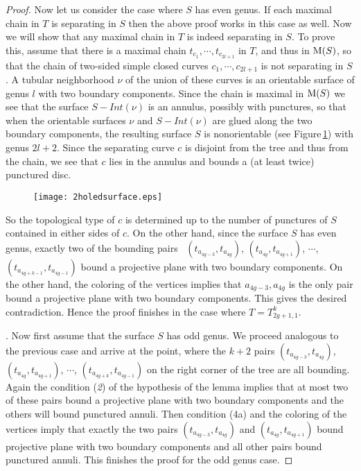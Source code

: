 \documentclass[11 pt]{amsart}
\theoremstyle{definition}
\begin{document}
\begin{proof}
Now let us consider the case where $S$ has even genus. If each
maximal chain in $T$ is separating in $S$ then the above proof works
in this case as well. Now we will show that any maximal chain in $T$
is indeed separating in $S$. To prove this, assume that there is a
maximal chain $t_{c_1},\cdots,t_{c_{2l+1}}$ in $T$, and thus in
${\rm M}(S)$, so that the chain of two-sided simple closed curves
$c_1,\cdots,c_{2l+1}$ is not separating in $S$. A tubular
neighborhood $\nu$ of the union of these curves is an orientable
surface of genus $l$ with two boundary components. Since the chain
is maximal in ${\rm M}(S)$ we see that the surface $S-Int(\nu)$ is
an annulus, possibly with punctures, so that when the orientable
surfaces $\nu$ and $S-Int(\nu)$ are glued along the two boundary
components, the resulting surface $S$ is nonorientable (see
Figure\,\ref{2holedsurface}) with genus $2l+2$. Since the separating
curve $c$ is disjoint from the tree and thus from the chain, we see
that $c$ lies in the annulus and bounds a (at least twice) punctured
disc.

\begin{figure}[hbt]
 \begin{center}
 \texttt{[image: 2holedsurface.eps]}
\caption {} \label{2holedsurface}
\end{center}
\end{figure}

So the topological type of $c$ is determined up to the number of
punctures of $S$ contained in either sides of $c$. On the other
hand, since the surface $S$ has even genus, exactly two of the
bounding pairs  \ $(t_{a_{4g-3}},t_{a_{4g}})$,
$(t_{a_{4g}},t_{a_{4g+1}})$, $\cdots$,
$(t_{a_{4g+k-1}},t_{a_{4g-1}})$ bound a projective plane with two
boundary components. On the other hand, the coloring of the vertices
implies that $a_{4g-3},a_{4g}$ is the only pair bound a projective
plane with two boundary components. This gives the desired
contradiction. Hence the proof finishes in the case where
$T=T_{2g+1,1}^k$.
\bigskip

. Now first assume that the
surface $S$ has odd genus. We proceed analogous to the previous case
and arrive at the point, where the $k+2$ pairs
$(t_{a_{4g-3}},t_{a_{4g}})$, $(t_{a_{4g}},t_{a_{4g+1}})$, $\cdots$,
$(t_{a_{4g+k}},t_{a_{4g-1}})$ on the right corner of the tree are
all bounding. Again the condition ({\it 2}) of the hypothesis of the
lemma implies that at most two of these pairs bound a projective
plane with two boundary components and the others will bound
punctured annuli. Then condition (4a) and the coloring of the
vertices imply that exactly the two pairs
$(t_{a_{4g-3}},t_{a_{4g}})$ and $(t_{a_{4g}},t_{a_{4g+1}})$ bound
projective plane with two boundary components and all other pairs
bound punctured annuli. This finishes the proof for the odd genus
case.


\end{proof}
\end{document}
